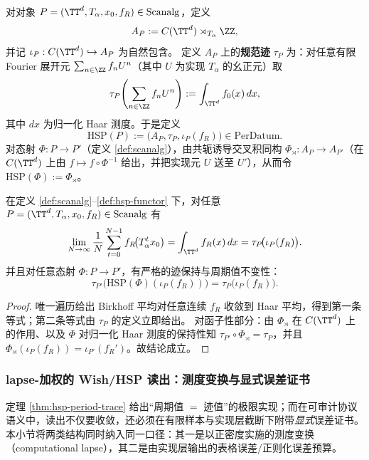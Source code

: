 \begin{definition}\label{def:hsp-functor}
对对象 \(P=(\TT^d,T_\alpha,x_0,f_R)\in\mathrm{Scanalg}\)，定义
\[
A_P:=C(\TT^d)\rtimes_{T_\alpha}\ZZ,
\]
并记 \(\iota_P:C(\TT^d)\hookrightarrow A_P\) 为自然包含。
定义 \(A_P\) 上的\textbf{规范迹} \(\tau_P\) 为：对任意有限 Fourier 展开元
\(
\sum_{n\in\ZZ} f_n U^n
\)（其中 \(U\) 为实现 \(T_\alpha\) 的幺正元）取
\[
\tau_P\!\left(\sum_{n\in\ZZ} f_n U^n\right):=\int_{\TT^d} f_0(x)\,dx,
\]
其中 \(dx\) 为归一化 Haar 测度。于是定义
\[
\mathrm{HSP}(P):=\bigl(A_P,\tau_P,\iota_P(f_R)\bigr)\in\mathrm{PerDatum}.
\]
对态射 \(\Phi:P\to P'\)（定义 \ref{def:scanalg}），由共轭诱导交叉积同构 \(\Phi_\rtimes:A_P\to A_{P'}\)（在 \(C(\TT^d)\) 上由 \(f\mapsto f\circ\Phi^{-1}\) 给出，并把实现元 \(U\) 送至 \(U'\)），从而令 \(\mathrm{HSP}(\Phi):=\Phi_\rtimes\)。
\end{definition}

\begin{theorem}[“周期值 \(=\) 迹值”：唯一遍历 Birkhoff 平均的非交换表述]\label{thm:hsp-period-trace}
在定义 \ref{def:scanalg}--\ref{def:hsp-functor} 下，对任意 \(P=(\TT^d,T_\alpha,x_0,f_R)\in\mathrm{Scanalg}\) 有
\[
\lim_{N\to\infty}\frac{1}{N}\sum_{t=0}^{N-1} f_R\!\bigl(T_\alpha^t x_0\bigr)
=\int_{\TT^d} f_R(x)\,dx
=\tau_P\!\bigl(\iota_P(f_R)\bigr).
\]
并且对任意态射 \(\Phi:P\to P'\)，有严格的迹保持与周期值不变性：
\[
\tau_{P'}\!\bigl(\mathrm{HSP}(\Phi)(\iota_P(f_R))\bigr)=\tau_P\!\bigl(\iota_P(f_R)\bigr).
\]
\end{theorem}

\begin{proof}
唯一遍历给出 Birkhoff 平均对任意连续 \(f_R\) 收敛到 Haar 平均，得到第一条等式；第二条等式由 \(\tau_P\) 的定义立即给出。
对函子性部分：由 \(\Phi_\rtimes\) 在 \(C(\TT^d)\) 上的作用、以及 \(\Phi\) 对归一化 Haar 测度的保持性知 \(\tau_{P'}\circ \Phi_\rtimes=\tau_P\)，并且 \(\Phi_\rtimes(\iota_P(f_R))=\iota_{P'}(f_R')\)。故结论成立。
\end{proof}

\subsubsection{lapse-加权的 Wish/HSP 读出：测度变换与显式误差证书}\label{app:op-algebra-wish-lapse}
定理 \ref{thm:hsp-period-trace} 给出“周期值 \(=\) 迹值”的极限实现；而在可审计协议语义中，读出不仅要收敛，还必须在有限样本与实现层截断下附带\emph{显式}误差证书。
本小节将两类结构同时纳入同一口径：其一是以正密度实施的测度变换（computational lapse），其二是由实现层输出的表格误差/正则化误差预算。

